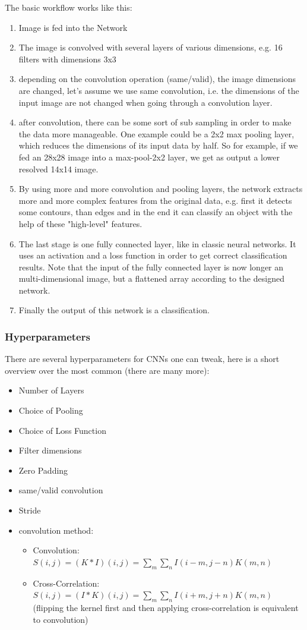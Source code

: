 \documentclass[paper=a4, fontsize=11pt]{scrartcl} %
\numberwithin{equation}{section} %
\numberwithin{figure}{section} %
\numberwithin{table}{section} %
\begin{document}
The basic workflow works like this:
\begin{enumerate}
	\setlength\itemsep{0em}
	\item Image is fed into the Network
	\item The image is convolved with several layers of various dimensions, e.g. 16 filters with dimensions 3x3
	\item depending on the convolution operation (same/valid), the image dimensions are changed, let's assume we use same convolution, i.e. the dimensions of the input image are not changed when going through a convolution layer.
	\item after convolution, there can be some sort of sub sampling in order to make the data more manageable. One example could be a 2x2 max pooling layer, which reduces the dimensions of its input data by half. So for example, if we fed an 28x28 image into a max-pool-2x2 layer, we get as output a lower resolved 14x14 image.
	\item By using more and more convolution and pooling layers, the network extracts more and more complex features from the original data, e.g. first it detects some contours, than edges and in the end it can classify an object with the help of these "high-level" features.
	\item The last stage is one fully connected layer, like in classic neural networks. It uses an activation and a loss function in order to get correct classification results. Note that the input of the fully connected layer is now longer an multi-dimensional image, but a flattened array according to the designed network.
	\item Finally the output of this network is a classification. 
\end{enumerate}

\subsubsection{Hyperparameters}
There are several hyperparameters for CNNs one can tweak, here is a short overview over the most common (there are many more):
\begin{itemize}
	\setlength\itemsep{0em}
	\item Number of Layers
	\item Choice of Pooling
	\item Choice of Loss Function
	\item Filter dimensions
	\item Zero Padding
	\item same/valid convolution
	\item Stride
	\item convolution method:
	\begin{itemize}
		\item Convolution: $S(i,j) = (K \ast I)(i,j) = \sum \limits _m \sum \limits _n I(i-m,j-n)K(m,n)$
		\item Cross-Correlation: $S(i,j) = (I \ast K)(i,j) = \sum \limits _m \sum \limits _n I(i+m,j+n)K(m,n)$\\(flipping the kernel first and then applying cross-correlation is equivalent to convolution)
	\end{itemize}
\end{itemize}
\end{document}
